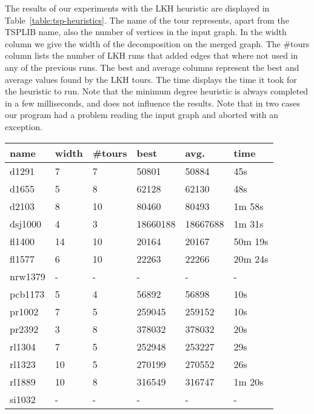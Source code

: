 \documentclass[12pt]{article}
\begin{document}
    The results of our experiments with the LKH heuristic are displayed in
    Table~\ref{table:tsp-heuristics}. The name of the tour represents, apart from the TSPLIB name,
    also the number of vertices in the input graph.  In the width column we give the width of the
    decomposition on the merged graph. The \#tours column lists the number of LKH runs that added
    edges that where not used in any of the previous runs. The best and average columns represent
    the best and average values found by the LKH tours. The time displays the time it took for the
    heuristic to run. Note that the minimum degree heuristic is always completed in a few
    milliseconds, and does not influence the results.
    Note that in two cases our program had a problem reading the input graph and aborted with an
    exception.

    \begin{table}
    \begin{tabular}{l l l l l l}
        name    & width & \#tours   & best      & avg.      & time \\ \hline
        d1291   & 7     & 7         & 50801     & 50884     & 45s \\
        d1655   & 5     & 8         & 62128     & 62130     & 48s \\
        d2103   & 8     & 10        & 80460     & 80493     & 1m 58s \\
        dsj1000 & 4     & 3         & 18660188  & 18667688  & 1m 31s \\
        fl1400  & 14    & 10        & 20164     & 20167     & 50m 19s \\
        fl1577  & 6     & 10        & 22263     & 22266     & 20m 24s \\
        nrw1379 & -     & -         & -         & -         & - \\
        pcb1173 & 5     & 4         & 56892     & 56898     & 10s \\
        pr1002  & 7     & 5         & 259045    & 259152    & 10s \\
        pr2392  & 3     & 8         & 378032    & 378032    & 20s \\
        rl1304  & 7     & 5         & 252948    & 253227    & 29s \\
        rl1323  & 10    & 5         & 270199    & 270552    & 26s \\
        rl1889  & 10    & 8         & 316549    & 316747    & 1m 20s \\
        si1032  & -     & -         & -         & -         & - \\

\end{tabular}
\end{table}
\end{document}
